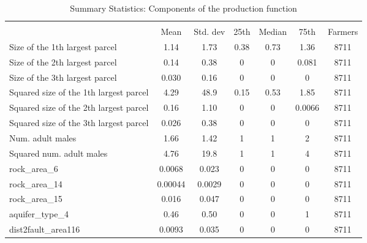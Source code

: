 \begin{table}[htbp]\centering
\def\sym#1{\ifmmode^{#1}\else\(^{#1}\)\fi}
\caption{Summary Statistics: Components of the production function}
\begin{tabular*}{1.0\hsize}{@{\hskip\tabcolsep\extracolsep\fill}l*{1}{cccccc}}
\toprule
                                    &\multicolumn{6}{c}{}                                                         \\
                                    &        Mean&    Std. dev&        25th&      Median&        75th&     Farmers\\
\midrule
Size of the 1th largest parcel      &        1.14&        1.73&        0.38&        0.73&        1.36&        8711\\
Size of the 2th largest parcel      &        0.14&        0.38&           0&           0&       0.081&        8711\\
Size of the 3th largest parcel      &       0.030&        0.16&           0&           0&           0&        8711\\
Squared size of the 1th largest parcel&        4.29&        48.9&        0.15&        0.53&        1.85&        8711\\
Squared size of the 2th largest parcel&        0.16&        1.10&           0&           0&      0.0066&        8711\\
Squared size of the 3th largest parcel&       0.026&        0.38&           0&           0&           0&        8711\\
Num. adult males                    &        1.66&        1.42&           1&           1&           2&        8711\\
Squared num. adult males            &        4.76&        19.8&           1&           1&           4&        8711\\
rock\_area\_6                         &      0.0068&       0.023&           0&           0&           0&        8711\\
rock\_area\_14                        &     0.00044&      0.0029&           0&           0&           0&        8711\\
rock\_area\_15                        &       0.016&       0.047&           0&           0&           0&        8711\\
aquifer\_type\_4                      &        0.46&        0.50&           0&           0&           1&        8711\\
dist2fault\_area116                  &      0.0093&       0.035&           0&           0&           0&        8711\\

\end{tabular*}
\end{table}
